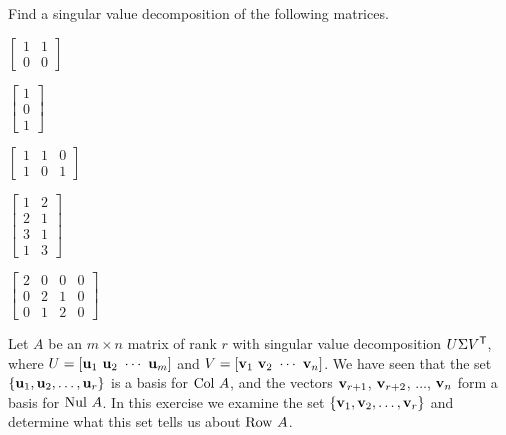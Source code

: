 \label{sec:svd_exer}
\be
\item Find a singular value decomposition of the following matrices.
	\ba
	\begin{minipage}{2.0in}
	\item $\left[ \begin{array}{cc} 1&1\\0&0 \end{array} \right]$
	\end{minipage}
	\begin{minipage}{2.0in}
	\item $\left[ \begin{array}{c} 1\\0\\1 \end{array} \right]$
	\end{minipage}
	
	\begin{minipage}{2.0in}
	\item $\left[ \begin{array}{ccc} 1&1&0\\1&0&1 \end{array} \right]$
	\end{minipage}
	\begin{minipage}{2.0in}
	\item $\left[ \begin{array}{cc} 1&2\\2&1\\3&1\\1&3 \end{array} \right]$
	\end{minipage}
	
	\begin{minipage}{2.0in}
	\item $\left[ \begin{array}{cccc} 2&0&0&0\\0&2&1&0\\0&1&2&0 \end{array} \right]$
	\end{minipage}
	\ea
	
\item Let $A$ be an $m \times n$ matrix of rank $r$ with singular value decomposition $U \Sigma V^{\mathsf{T}}$, where $U = [ \vu_1 \ \vu_2 \ \cdots \ \vu_m ]$ and $V = [\vv_1 \ \vv_2 \ \cdots \ \vv_n]$. We have seen that the set $\{ \mathbf{u}_1, \mathbf{u}_2, \ldots, \mathbf{u}_r\}$  is a basis for $\text{Col } A$, and the vectors $\mathbf{v}_{r+1}$, $\mathbf{v}_{r+2}$, $\ldots$, $\mathbf{v}_n$ form a basis for $\text{Nul } A$. In this exercise we examine the set $\{\mathbf{v}_1, \mathbf{v}_2, \ldots, \mathbf{v}_r\}$ and determine what this set tells us about $\text{Row } A$. 

